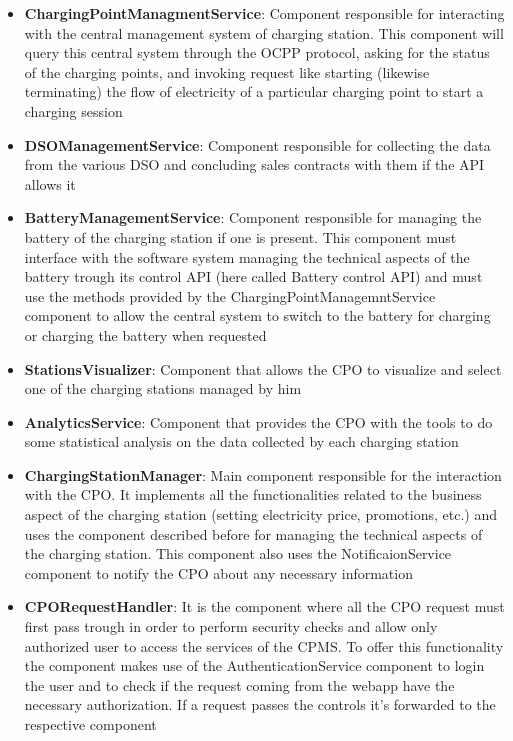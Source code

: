 \begin{itemize}
    \item \textbf{ChargingPointManagmentService}: Component responsible for interacting with the central management system of charging station. This component will query this central system through the OCPP protocol, asking for the status of the charging points, and invoking request like starting (likewise terminating) the flow of electricity of a particular charging point to start a charging session

    \item \textbf{DSOManagementService}: Component responsible for collecting the data from the various DSO and concluding sales contracts with them if the API allows it

    \item \textbf{BatteryManagementService}: Component responsible for managing the battery of the charging station if one is present. This component must interface with the software system managing the technical aspects of the battery trough its control API (here called Battery control API) and must use the methods provided by the ChargingPointManagemntService component to allow the central system to switch to the battery for charging or charging the battery when requested

    \item \textbf{StationsVisualizer}: Component that allows the CPO to visualize and select one of the charging stations managed by him

    \item \textbf{AnalyticsService}: Component that provides the CPO with the tools to do some statistical analysis on the data collected by each charging station

    \item \textbf{ChargingStationManager}: Main component responsible for the interaction with the CPO. It implements all the functionalities related to the business aspect of the charging station (setting electricity price, promotions, etc.) and uses the component described before for managing the technical aspects of the charging station. This component also uses the NotificaionService component to notify the CPO about any necessary information

    \item \textbf{CPORequestHandler}: It is the component where all the CPO request must first pass trough in order to perform security checks and allow only authorized user to access the services of the CPMS. To offer this functionality the component makes use of the AuthenticationService component to login the user and to check if the request coming from the webapp have the necessary authorization. If a request passes the controls it's forwarded to the respective component


\end{itemize}
